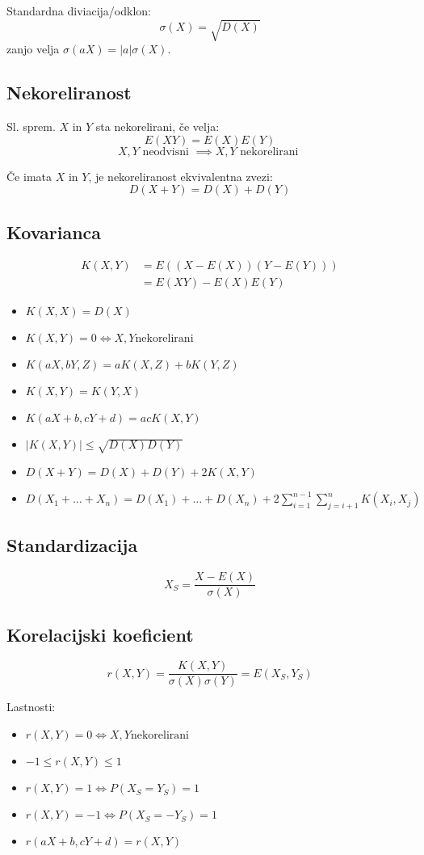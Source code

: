 \begin{multicols}{5}
Standardna diviacija/odklon:
\[ \sigma(X) = \sqrt{D(X)} \]
zanjo velja $\sigma (aX) = |a|\sigma(X)$.


\subsection{Nekoreliranost}
Sl. sprem. $X$ in $Y$ sta nekorelirani, če velja:
\[ E(XY) = E(X)E(Y) \]
\[ X, Y \text{ neodvisni } \implies X,Y \text{ nekorelirani }\]

Če imata $X$ in $Y$, je nekoreliranost ekvivalentna zvezi:
\[ D(X+Y) = D(X) + D(Y)\]

\subsection{Kovarianca}
\begin{align*}
    K(X,Y) &= E((X-E(X))(Y-E(Y))) \\
    &= E(XY)-E(X)E(Y)
\end{align*}

\begin{itemize}
    \item $K(X,X) = D(X)$
    \item $K(X,Y) = 0 \iff X,Y \text{nekorelirani}$
    \item $K(aX,bY, Z) = aK(X, Z) + bK(Y, Z)$
    \item $K(X,Y) = K(Y,X)$
    \item $K(aX+b,cY+d) = acK(X,Y)$
    \item $|K(X,Y)| \leq \sqrt{D(X)D(Y)}$
    \item $D(X+Y) = D(X) + D(Y) + 2K(X,Y)$ 
    \item $D(X_1 + \dots + X_n) = D(X_1) + \dots + D(X_n) + 2\sum_{i=1}^{n-1}\sum_{j=i+1}^{n} K(X_i, X_j)$
\end{itemize}

\subsection{Standardizacija}
\[X_S = \frac{X-E(X)}{\sigma(X)}\]

\subsection{Korelacijski koeficient}
\[r(X,Y) = \frac{K(X, Y)}{ \sigma(X) \sigma(Y)} = E(X_S, Y_S)\]

Lastnosti:
\begin{itemize}
    \item $r(X,Y) = 0 \iff X, Y \text{nekorelirani}$
    \item $-1 \leq r(X,Y) \leq 1$
    \item $r(X,Y) = 1 \iff P(X_S = Y_S) = 1$
    \item $r(X,Y) = -1 \iff P(X_S = -Y_S) = 1$
    \item $r(aX+b, cY+d) = r(X, Y)$
\end{itemize}


\end{multicols}
